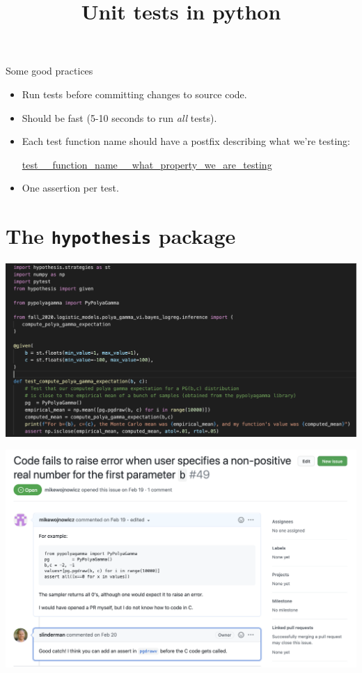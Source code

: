 \documentclass[10pt]{beamer}
\title{Unit tests in python}
\begin{document}
\maketitle

\begin{frame}{Some good practices}

\begin{itemize}
\item Run tests before committing changes to source code. 
\item Should be \alert{fast} (5-10 seconds to run \textit{all} tests).
\item Each test function name should have a postfix describing what we're testing:
	\begin{center}\url{test__function_name__what_property_we_are_testing}	
	\end{center}
\item One assertion per test.
\end{itemize} 
\end{frame}

\section{The \texttt{hypothesis} package}

\begin{frame}
\begin{center}
\includegraphics[width=\textwidth]{images/pypolyagamma_test}	
\end{center}
	
\end{frame}

\begin{frame}
\begin{center}
\includegraphics[width=\textwidth]{images/pypolyagamma_issue}	
\end{center}
	
\end{frame}
\end{document}
